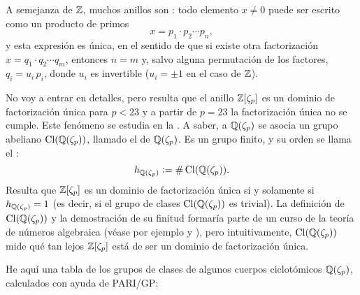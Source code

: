 \documentclass{article}
\numberwithin{equation}{section}
\theoremstyle{definition}
\begin{document}
A semejanza de $\mathbb{Z}$, muchos anillos son :
todo elemento $x\ne 0$ puede ser escrito como un producto de primos
$$x = p_1\cdot p_2\cdots p_n,$$
y esta expresión es única, en el sentido de que si existe otra factorización
$x = q_1\cdot q_2\cdots q_m$, entonces $n = m$ y, salvo alguna permutación de
los factores, $q_i = u_i\,p_i$, donde $u_i$ es invertible ($u_i = \pm 1$ en el
caso de $\mathbb{Z}$).

No voy a entrar en detalles, pero resulta que el anillo $\mathbb{Z} [\zeta_p]$ es
un dominio de factorización única para $p < 23$ y a partir de $p = 23$
la factorización única no se cumple. Este fenómeno se estudia en
la . A saber, a $\mathbb{Q} (\zeta_p)$ se asocia un
grupo abeliano $\operatorname{Cl} (\mathbb{Q} (\zeta_p))$, llamado el  de
$\mathbb{Q} (\zeta_p)$. Es un grupo finito, y su orden se llama el
:
$$h_{\mathbb{Q} (\zeta_p)} \mathrel{\mathop:}= \# \operatorname{Cl} (\mathbb{Q} (\zeta_p)).$$
Resulta que $\mathbb{Z} [\zeta_p]$ es un dominio de factorización única si y solamente
si $h_{\mathbb{Q} (\zeta_p)} = 1$ (es decir, si el grupo de clases
$\operatorname{Cl} (\mathbb{Q} (\zeta_p))$ es trivial). La definición de $\operatorname{Cl} (\mathbb{Q} (\zeta_p))$ y
la demostración de su finitud formaría parte de un curso de la teoría de números
algebraica (véase por ejemplo \cite{Neukirch-1999} y \cite{Marcus-1977}), pero
intuitivamente, $\operatorname{Cl} (\mathbb{Q} (\zeta_p))$ mide qué tan lejos $\mathbb{Z} [\zeta_p]$ está
de ser un dominio de factorización única.

He aquí una tabla de los grupos de clases de algunos cuerpos ciclotómicos
$\mathbb{Q} (\zeta_p)$, calculados con ayuda de PARI/GP:
\end{document}

